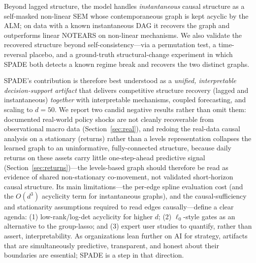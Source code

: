 Beyond lagged structure, the model handles \emph{instantaneous} causal structure
as a self-masked non-linear SEM whose contemporaneous graph is kept acyclic by the
ALM; on data with a known instantaneous DAG it recovers the graph and outperforms
linear NOTEARS on non-linear mechanisms. We also validate the recovered structure
beyond self-consistency---via a permutation test, a time-reversal placebo, and a
ground-truth structural-change experiment in which SPADE both detects a known
regime break and recovers the two distinct graphs.

SPADE's contribution is therefore best understood as a \emph{unified,
interpretable decision-support artifact} that delivers competitive structure
recovery (lagged and instantaneous) \emph{together} with interpretable mechanisms,
coupled forecasting, and scaling to $d{=}50$. We report two candid negative
results rather than omit them: documented real-world policy shocks are not
cleanly recoverable from observational macro data (Section~\ref{sec:real}),
and redoing the real-data causal analysis on a stationary (returns) rather
than a levels representation collapses the learned graph to an
uninformative, fully-connected structure, because daily returns on these
assets carry little one-step-ahead predictive signal
(Section~\ref{sec:returns})---the levels-based graph should therefore be read
as evidence of shared non-stationary co-movement, not validated short-horizon
causal structure. Its main limitations---the per-edge
spline evaluation cost (and the $O(d^3)$ acyclicity term for instantaneous
graphs), and the causal-sufficiency and stationarity assumptions required to read
edges causally---define a clear agenda: (1) low-rank/log-det acyclicity for higher
$d$; (2) $\ell_0$-style gates as an alternative to the group-lasso; and
(3) expert user studies to quantify, rather than assert, interpretability. As
organizations lean further on AI for strategy, artifacts that are simultaneously
predictive, transparent, and honest about their boundaries are essential; SPADE
is a step in that direction.
